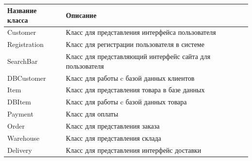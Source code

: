 \begin{table}[h!tp]
	\centering
	\caption{}
	\label{tabular:descriptions}
	\begin{tabular}{|p{}|p{}|}
		\hline \textbf{Название класса} & \textbf{Описание} \\ \hline
		Customer & Класс для представления интерфейса пользователя \\ \hline
		Registration & Класс для регистрации пользователя в системе \\ \hline
		SearchBar & Класс для представляющий интерфейс сайта
			для пользователя \\ \hline
		DBCustomer & Класс для работы c базой данных клиентов \\ \hline
		Item & Класс для представления товара в базе данных \\ \hline
		DBItem & Класс для работы c базой данных товара \\ \hline
		Payment & Класс для оплаты \\ \hline
		Order & Класс для представления заказа \\ \hline
		Warehouse & Класс для представления склада \\ \hline
		Delivery & Класс для представления интерфейс доставки\\ \hline
	\end{tabular}
\end{table}

